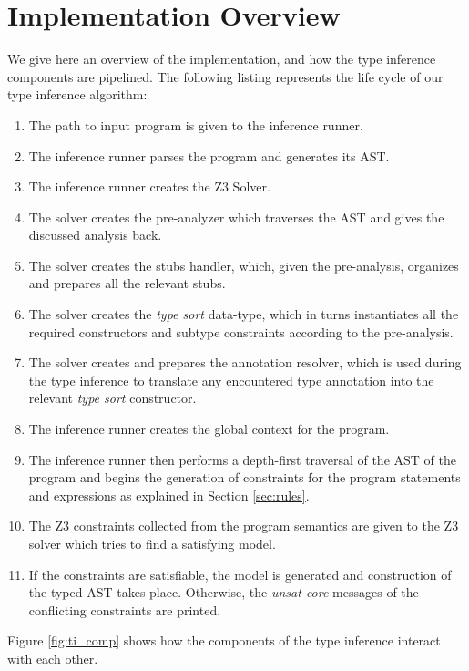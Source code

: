 \section{Implementation Overview}
We give here an overview of the implementation, and how the type inference components are pipelined. The following listing represents the life cycle of our type inference algorithm:

\begin{enumerate}
	\item The path to input program is given to the inference runner.
	\item The inference runner parses the program and generates its AST.
	\item The inference runner creates the Z3 Solver.
	\item The solver creates the pre-analyzer which traverses the AST and gives the discussed analysis back.
	\item The solver creates the stubs handler, which, given the pre-analysis, organizes and prepares all the relevant stubs.
	\item The solver creates the \textit{type sort} data-type, which in turns instantiates all the required constructors and subtype constraints according to the pre-analysis.
	\item The solver creates and prepares the annotation resolver, which is used during the type inference to translate any encountered type annotation into the relevant \textit{type sort} constructor.
	\item The inference runner creates the global context for the program.
	\item The inference runner then performs a depth-first traversal of the AST of the program and begins the generation of constraints for the program statements and expressions as explained in Section \ref{sec:rules}.
	\item The Z3 constraints collected from the program semantics are given to the Z3 solver which tries to find a satisfying model.
	\item If the constraints are satisfiable, the model is generated and construction of the typed AST takes place. Otherwise, the \textit{unsat core} messages of the conflicting constraints are printed.
\end{enumerate}
Figure \ref{fig:ti_comp} shows how the components of the type inference interact with each other.

